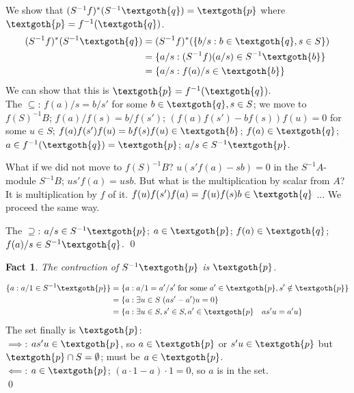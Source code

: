 \documentclass{article}
\newtheorem{theorem}{Fact}[section]
\begin{document}
\noindent
We show that $(S^{-1}f)^*(S^{-1}\textgoth{q}) = \textgoth{p}$ where $\textgoth{p} = f^{-1}(\textgoth{q})$.
\begin{equation*}
\begin{split}
  (S^{-1}f)^*(S^{-1}\textgoth{q}) 
    & = (S^{-1}f)^*(\{ b/s: b \in \textgoth{q}, s \in S\}) \\
    & = \{ a/s: (S^{-1}f)(a/s) \in S^{-1}\textgoth{b} \} \\
    & = \{ a/s: f(a)/s \in \textgoth{b} \}
\end{split}
\end{equation*}
We can show that this is $\textgoth{p} = f^{-1}(\textgoth{q})$. \\

The $\subseteq$: $f(a)/s = b/s'$ for some $b \in \textgoth{q}, s \in S$; we move to $f(S)^{-1}B$; $f(a)/f(s) = b/f(s')$; $(f(a)f(s') - bf(s))f(u) = 0$ for some $u \in S$; $f(a)f(s')f(u) = bf(s)f(u) \in \textgoth{b}$; $f(a) \in \textgoth{q}$; $a \in f^{-1}(\textgoth{q}) = \textgoth{p}$; $a/s \in S^{-1}\textgoth{p}$. 

What if we did not move to $f(S)^{-1}B$? $u(s'f(a) - sb) = 0$ in the $S^{-1}A$-module $S^{-1}B$; $us'f(a) = usb$. But what is the multiplication by scalar from $A$? It is multiplication by $f$ of it. $f(u)f(s')f(a) = f(u)f(s)b \in \textgoth{q}$ ... We proceed the same way.

The $\supseteq$: $a/s \in S^{-1}\textgoth{p}$; $a \in \textgoth{p}$; $f(a) \in \textgoth{q}$; $f(a)/s \in S^{-1}\textgoth{q}$.
\qed

\begin{theorem}
The contraction of $S^{-1}\textgoth{p}$ is $\textgoth{p}$.
\end{theorem}

\noindent
\begin{equation*}
\begin{split}
\{a: a/1 \in S^{-1}\textgoth{p}\} & = \{ a: a/1 = a'/s' \; \text{for some} \; a' \in \textgoth{p}, s' \notin \textgoth{p} \} \\
& = \{a: \exists u \in S \; (as' - a')u = 0 \} \\
& = \{a: \exists u \in S, s' \in S, a' \in \textgoth{p} \quad as'u = a'u  \}
\end{split}
\end{equation*}
The set finally is $\textgoth{p}$: \\
$\implies$: $as'u \in \textgoth{p}$, so $a \in \textgoth{p}$ or $s'u \in \textgoth{p}$ but $\textgoth{p} \cap S = \emptyset$; must be $a \in \textgoth{p}$. \\
$\impliedby$: $a \in \textgoth{p}$; $(a \cdot 1 - a)\cdot 1 = 0$, so $a$ is in the set. \\
\qed
\end{document}
